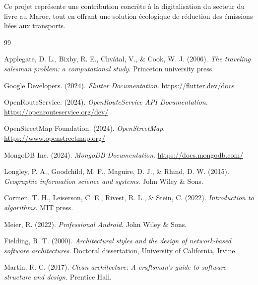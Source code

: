 \documentclass[12pt,a4paper]{report}
\begin{document}
Ce projet représente une contribution concrète à la digitalisation du secteur du livre au Maroc, tout en offrant une solution écologique de réduction des émissions liées aux transports.


\begin{thebibliography}{99}

Applegate, D. L., Bixby, R. E., Chvátal, V., \& Cook, W. J. (2006).
\textit{The traveling salesman problem: a computational study}.
Princeton university press.

Google Developers. (2024).
\textit{Flutter Documentation}.
\url{https://flutter.dev/docs}

OpenRouteService. (2024).
\textit{OpenRouteService API Documentation}.
\url{https://openrouteservice.org/dev/}

OpenStreetMap Foundation. (2024).
\textit{OpenStreetMap}.
\url{https://www.openstreetmap.org/}

MongoDB Inc. (2024).
\textit{MongoDB Documentation}.
\url{https://docs.mongodb.com/}

Longley, P. A., Goodchild, M. F., Maguire, D. J., \& Rhind, D. W. (2015).
\textit{Geographic information science and systems}.
John Wiley \& Sons.

Cormen, T. H., Leiserson, C. E., Rivest, R. L., \& Stein, C. (2022).
\textit{Introduction to algorithms}.
MIT press.

Meier, R. (2022).
\textit{Professional Android}.
John Wiley \& Sons.

Fielding, R. T. (2000).
\textit{Architectural styles and the design of network-based software architectures}.
Doctoral dissertation, University of California, Irvine.

Martin, R. C. (2017).
\textit{Clean architecture: A craftsman's guide to software structure and design}.
Prentice Hall.

\end{thebibliography}


\appendix
\end{document}
